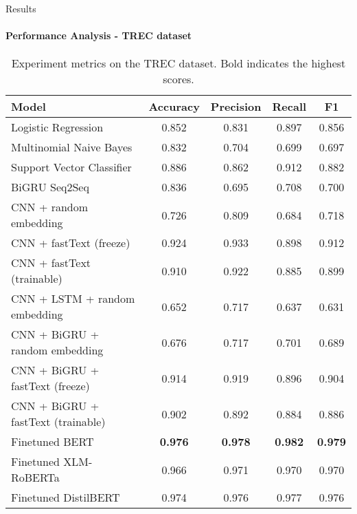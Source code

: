 \begin{frame}{Results}
\framesubtitle{Performance Analysis - TREC dataset}

\begin{table}
\small{
\begin{tabular*}{\linewidth}{@{\extracolsep\fill}lcccc}
\hline
\textbf{Model}                & \textbf{Accuracy} & \textbf{Precision} & \textbf{Recall} &  \textbf{F1} \\ \hline
Logistic Regression   & 0.852 & 0.831          & 0.897       & 0.856  \\ 
Multinomial Naive Bayes   & 0.832 & 0.704          & 0.699       & 0.697 \\ 
Support Vector Classifier & 0.886 & 0.862          & 0.912       & 0.882  \\ \hline
BiGRU Seq2Seq            & 0.836 & 0.695          & 0.708       & 0.700  \\ \hline
CNN + random embedding                 & 0.726 & 0.809          & 0.684       & 0.718   \\
CNN + fastText (freeze)   & 0.924 & 0.933          & 0.898       & 0.912    \\
CNN + fastText (trainable) & 0.910 & 0.922          & 0.885       & 0.899    \\ \hline
CNN + LSTM + random embedding  & 0.652 & 0.717          & 0.637       & 0.631  \\
CNN + BiGRU + random embedding     & 0.676 & 0.717          & 0.701       & 0.689   \\
CNN + BiGRU + fastText (freeze)   & 0.914 & 0.919          & 0.896       & 0.904  \\
CNN + BiGRU + fastText (trainable) & 0.902 & 0.892          & 0.884       & 0.886 \\ \hline
Finetuned BERT & \textbf{0.976} & \textbf{0.978} & \textbf{0.982} & \textbf{0.979}  \\
Finetuned XLM-RoBERTa & 0.966 & 0.971          & 0.970       & 0.970  \\ \hline
Finetuned DistilBERT  & 0.974 & 0.976 & 0.977  & 0.976  \\ \hline
\end{tabular*}
}
\caption{Experiment metrics on the TREC dataset. Bold indicates the highest scores.} \label{tab:result-TREC}
\end{table}
\end{frame}

